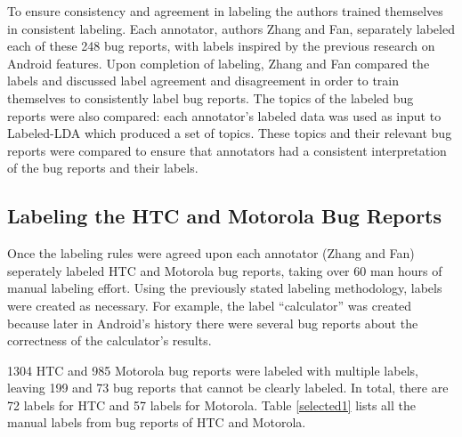 \documentclass[10pt, conference, compsocconf]{IEEEtran}
\begin{document}
To ensure consistency and agreement in labeling the authors trained
themselves in consistent labeling.
Each annotator, authors Zhang and Fan, separately labeled each of these 248 bug reports, 
with labels inspired by the previous research on Android
features. 
Upon completion of labeling, 
 Zhang and Fan compared the labels
and discussed label agreement and
disagreement in order to train themselves to consistently label bug
reports.
The topics of the labeled bug reports were also compared: each annotator's labeled data was used as input to
 Labeled-LDA which produced a set of topics.
These topics and their relevant bug reports were compared to ensure
that annotators had a 
consistent interpretation of the bug reports and their labels.




\subsection{Labeling the HTC and Motorola Bug Reports}

Once the labeling rules were agreed upon each annotator (Zhang and Fan)
seperately labeled HTC and Motorola bug reports, taking over 60 man
hours of manual labeling effort.
Using the previously stated labeling methodology, labels were created as necessary.
For example, the label ``calculator'' was created because later in
Android's history there were 
several bug reports about the correctness of the
calculator's results. 


1304 HTC and 985 Motorola bug reports were labeled with multiple
labels, leaving 199 and 73 bug reports that cannot be clearly labeled.
In total, there are 72 labels for HTC and 57 labels for Motorola.
Table \ref{selected1} lists all the manual labels from bug reports of HTC
and Motorola.
\end{document}
